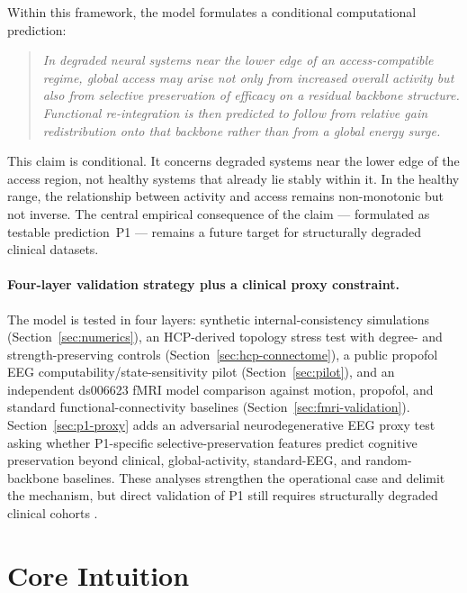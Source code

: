 \documentclass[11pt,a4paper]{article}
\theoremstyle{plain}
\theoremstyle{definition}
\theoremstyle{remark}
\begin{document}
Within this framework, the model formulates a conditional computational prediction:

\begin{quote}
\itshape
In degraded neural systems near the lower edge of an access-compatible regime, global access may arise not only from increased overall activity but also from selective preservation of efficacy on a residual backbone structure. Functional re-integration is then predicted to follow from relative gain redistribution onto that backbone rather than from a global energy surge.
\end{quote}

This claim is conditional. It concerns degraded systems near the lower edge of the access region, not healthy systems that already lie stably within it. In the healthy range, the relationship between activity and access remains non-monotonic but not inverse. The central empirical consequence of the claim --- formulated as testable prediction~P1 --- remains a future target for structurally degraded clinical datasets.

\paragraph{Four-layer validation strategy plus a clinical proxy constraint.}
The model is tested in four layers: synthetic internal-consistency simulations (Section~\ref{sec:numerics}), an HCP-derived topology stress test with degree- and strength-preserving controls (Section~\ref{sec:hcp-connectome}), a public propofol EEG computability/state-sensitivity pilot (Section~\ref{sec:pilot}), and an independent ds006623 fMRI model comparison against motion, propofol, and standard functional-connectivity baselines (Section~\ref{sec:fmri-validation}). Section~\ref{sec:p1-proxy} adds an adversarial neurodegenerative EEG proxy test asking whether P1-specific selective-preservation features predict cognitive preservation beyond clinical, global-activity, standard-EEG, and random-backbone baselines. These analyses strengthen the operational case and delimit the mechanism, but direct validation of P1 still requires structurally degraded clinical cohorts \citep{laureys2004,giacino2014}.


\section{Core Intuition}
\label{sec:intuition}
\end{document}
